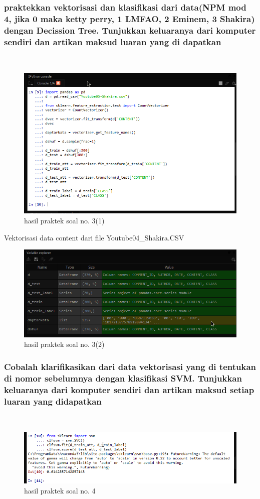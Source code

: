\subsubsection{praktekkan vektorisasi dan klasifikasi dari data(NPM mod 4, jika 0 maka ketty perry, 1 LMFAO, 2 Eminem, 3 Shakira) dengan Decission Tree. Tunjukkan keluaranya dari komputer sendiri dan artikan maksud luaran yang di dapatkan}
\hfill\\



	\begin{figure}[H]
	\centering
		\includegraphics[width=8 cm]{figures/1174067/4/9.png}
	\caption{hasil praktek soal no. 3(1)}
	\end{figure}
	Vektorisasi data content dari file Youtube04\_Shakira.CSV
	\begin{figure}[H]
	\centering
		\includegraphics[width=8 cm]{figures/1174067/4/10.png}
	\caption{hasil praktek soal no. 3(2)}
	\end{figure}
	
\subsubsection{Cobalah klarifikasikan dari data vektorisasi yang di tentukan di nomor sebelumnya dengan klasifikasi SVM. Tunjukkan keluaranya dari komputer sendiri dan artikan maksud setiap luaran yang didapatkan}
\hfill\\

	\begin{figure}[H]
	\centering
		\includegraphics[width=8 cm]{figures/1174067/4/11.png}
	\caption{hasil praktek soal no. 4}
	\end{figure}

